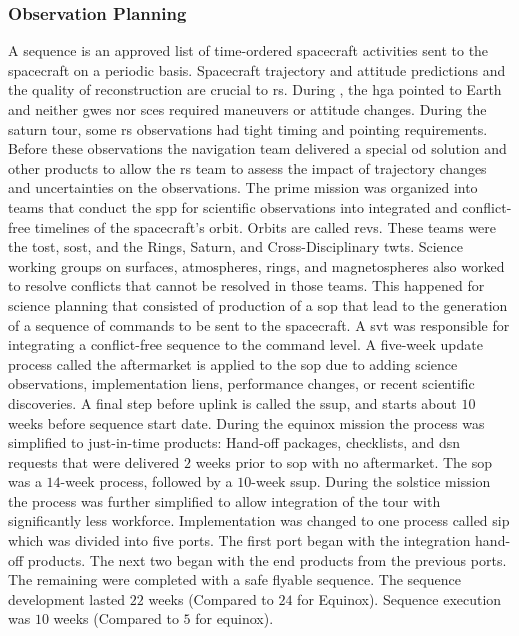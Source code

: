 \documentclass{article}
\theoremstyle{mystyle}
\begin{document}
\subsubsection{\footnotesize Observation Planning \label{subsubsec:usr_obs_planning}}

A \gls{sequence} is an approved list of time-ordered spacecraft activities sent to the spacecraft on a periodic basis. Spacecraft \gls{trajectory} and \gls{attitude} predictions and the quality of reconstruction are crucial to \gls{rs}. During , the \gls{hga} pointed to Earth and neither \glspl{gwe} nor \glspl{sce} required maneuvers or \gls{attitude} changes. During the \gls{saturn tour}, some \gls{rs} observations had tight timing and pointing requirements. Before these observations the navigation team delivered a special \gls{od} solution and other products to allow the \gls{rs} team to assess the impact of trajectory changes and uncertainties on the observations. The \gls{prime mission} was organized into teams that conduct the \gls{spp} for scientific observations into integrated and conflict-free timelines of the spacecraft's orbit. Orbits are called \glspl{rev}. These teams were the \gls{tost}, \gls{sost}, and the Rings, Saturn, and Cross-Disciplinary \glspl{twt}. Science working groups on surfaces, atmospheres, rings, and \glspl{magnetosphere} also worked to resolve conflicts that cannot be resolved in those teams. This happened for science planning that consisted of production of a \gls{sop} that lead to the generation of a sequence of commands to be sent to the spacecraft. A \gls{svt} was responsible for integrating a conflict-free sequence to the command level. A five-week update process called the aftermarket is applied to the \gls{sop} due to adding science observations, implementation liens, performance changes, or recent scientific discoveries. A final step before \gls{uplink} is called the \gls{ssup}, and starts about $10$ weeks before sequence start date. During the \gls{equinox mission} the process was simplified to just-in-time products: Hand-off packages, checklists, and \gls{dsn} requests that were delivered $2$ weeks prior to \gls{sop} with no aftermarket. The \gls{sop} was a $14$-week process, followed by a $10$-week \gls{ssup}. During the \gls{solstice mission} the process was further simplified to allow integration of the tour with significantly less workforce. Implementation was changed to one process called \gls{sip} which was divided into five ports. The first port began with the integration hand-off products. The next two began with the end products from the previous ports. The remaining were completed with a safe flyable sequence. The sequence development lasted $22$ weeks (Compared to $24$ for Equinox). Sequence execution was $10$ weeks (Compared to $5$ for equinox). 
\end{document}
